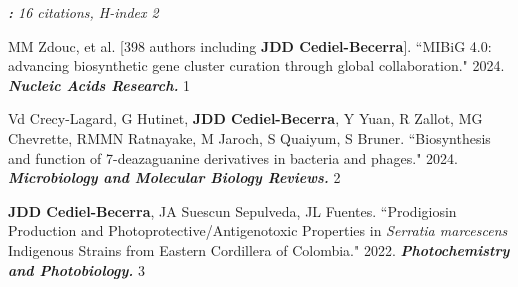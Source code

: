 
\textit{\textbf{:} 16 citations, H-index 2}

 \vspace{-2mm}

\begin{cvpubs}
\cvpub
{MM Zdouc, et al. [398 authors including \textbf{JDD Cediel-Becerra}]. ``MIBiG 4.0: advancing biosynthetic gene cluster curation through global collaboration." 2024. \textit{\textbf{Nucleic Acids Research.}} \textit{\textbf{}}}
{1}

\cvpub
{Vd Crecy-Lagard, G Hutinet, \textbf{JDD Cediel-Becerra}, Y Yuan, R Zallot, MG Chevrette, RMMN Ratnayake, M Jaroch, S Quaiyum, S Bruner. ``Biosynthesis and function of 7-deazaguanine derivatives in bacteria and phages." 2024. \textit{\textbf{Microbiology and Molecular Biology Reviews.}}\textit{\textbf{}}}
{2}

\cvpub
{\textbf{JDD Cediel-Becerra}, JA Suescun Sepulveda, JL Fuentes. ``Prodigiosin Production and Photoprotective/Antigenotoxic Properties in \textit{Serratia marcescens} Indigenous Strains from Eastern Cordillera of Colombia." 2022. \textit{\textbf{Photochemistry and Photobiology.}}\textit{\textbf{}}}
{3}
\end{cvpubs}






